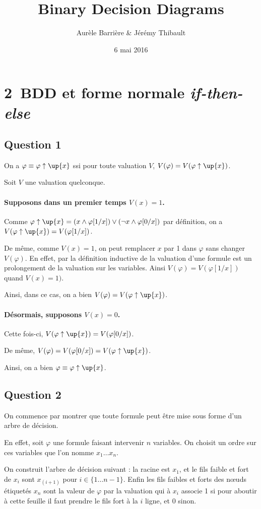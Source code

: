 \documentclass[12pt]{article}
\title{Binary Decision Diagrams}
\author{Aurèle Barrière \& Jérémy Thibault}
\date{6 mai 2016}
\def\question#1{\subsection*{Question #1}}
\def\phix{\varphi\uparrow\up{x}}
\def\ite{\textit{if-then-else}}
\begin{document}
\maketitle

\section*{2\ BDD et forme normale \ite}

\question{1}

On a $\varphi\equiv\phix$ ssi pour toute valuation $V$, $V(\varphi) = V(\phix)$.

Soit $V$ une valuation quelconque. 

\paragraph{Supposons dans un premier temps $V(x) = 1$.} Comme $\phix = (x \wedge\varphi[1/x])\vee(\neg x\wedge\varphi[0/x])$ par définition, on a $V(\phix) = V(\varphi[1/x])$.

De même, comme $V(x) = 1$, on peut remplacer $x$ par 1 dans $\varphi$ sans changer $V(\varphi)$. En effet, par la définition inductive de la valuation d'une formule est un prolongement de la valuation sur les variables. Ainsi $V(\varphi)=V(\varphi[1/x])$ quand $V(x)=1)$.

Ainsi, dans ce cas, on a bien $V(\varphi) = V(\phix)$.

\paragraph{Désormais, supposons $V(x)=0$.} Cette fois-ci, $V(\phix) = V(\varphi[0/x])$.

De même, $V(\varphi) =  V(\varphi[0/x]) = V(\phix)$.

Ainsi, on a bien $\varphi\equiv\phix$.

\question{2}

On commence par montrer que toute formule peut être mise sous forme d'un arbre de décision.

En effet, soit $\varphi$ une formule faisant intervenir $n$ variables. On choisit un ordre sur ces variables que l'on nomme $x_1\dots x_n$.

On construit l'arbre de décision suivant : la racine est $x_1$, et le fils faible et fort de $x_i$ sont $x_{(i+1)}$ pour $i\in\{1\dots n-1\}$. Enfin les fils faibles et forts des n\oe uds étiquetés $x_n$ sont la valeur de $\varphi$ par la valuation qui à $x_i$ associe 1 si pour aboutir à cette feuille il faut prendre le fils fort à la $i$ ligne, et 0 sinon.
\end{document}
